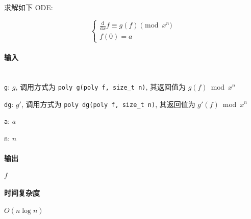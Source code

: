 求解如下 ODE:

\[
    \begin{cases}
        \frac{\mathrm{d}}{\mathrm{d}x}f\equiv g(f)\pmod{x^n} \\
        f(0)=a
    \end{cases}
\]

\paragraph{输入}~\\

\verb|g|: \(g\), 调用方式为 \verb|poly g(poly f, size_t n)|, 其返回值为 \(g(f)\bmod{x^n}\)

\verb|dg|: \(g'\), 调用方式为 \verb|poly dg(poly f, size_t n)|, 其返回值为 \(g'(f)\bmod{x^n}\)

\verb|a|: \(a\)

\verb|n|: \(n\)

\paragraph{输出}

\(f\)

\paragraph{时间复杂度}

\(O(n\log n)\)
